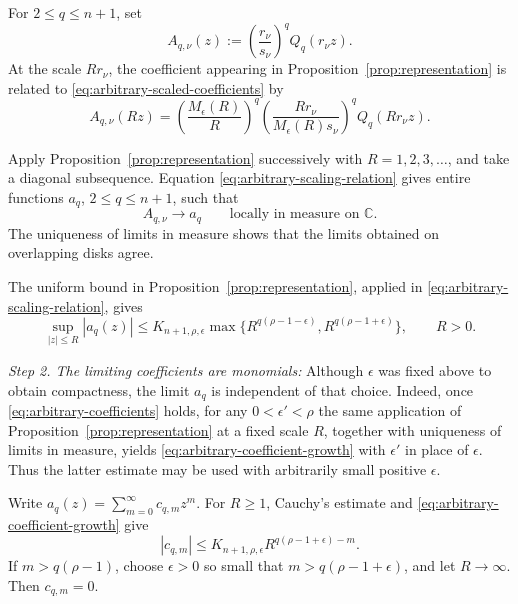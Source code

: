 \documentclass[12pt,letterpaper,reqno]{amsart}
\theoremstyle{definition}
\numberwithin{equation}{section}
\newcommand{\C}{\mathbb C}
\begin{document}
For \(2\leq q\leq n+1\), set
\begin{equation}\label{eq:arbitrary-scaled-coefficients}
 A_{q,\nu}(z)
 :=
 \left(\frac{r_\nu}{s_\nu}\right)^q
 Q_q(r_\nu z).
\end{equation}
At the scale \(Rr_\nu\), the coefficient appearing in
Proposition~\ref{prop:representation} is related to
\eqref{eq:arbitrary-scaled-coefficients} by
\begin{equation}\label{eq:arbitrary-scaling-relation}
 A_{q,\nu}(Rz)
 =
 \left(\frac{M_\epsilon(R)}{R}\right)^q
 \left(
 \frac{Rr_\nu}{M_\epsilon(R)s_\nu}
 \right)^q
 Q_q(Rr_\nu z).
\end{equation}

Apply Proposition~\ref{prop:representation} successively with
\(R=1,2,3,\ldots\), and take a diagonal subsequence. Equation
\eqref{eq:arbitrary-scaling-relation} gives entire functions
\(a_q\), \(2\leq q\leq n+1\), such that
\begin{equation}\label{eq:arbitrary-coefficients}
 A_{q,\nu}\longrightarrow a_q
 \qquad\text{locally in measure on }\C.
\end{equation}
The uniqueness of limits in measure shows that the limits obtained on
overlapping disks agree.

The uniform bound in
Proposition~\ref{prop:representation}, applied in
\eqref{eq:arbitrary-scaling-relation}, gives
\begin{equation}\label{eq:arbitrary-coefficient-growth}
 \sup_{|z|\leq R}|a_q(z)|
 \leq
 K_{{n+1},\rho,\epsilon}
 \max\{
 R^{q(\rho-1-\epsilon)},
 R^{q(\rho-1+\epsilon)}
 \},
 \qquad R>0.
\end{equation}


\medskip\noindent
\emph{{Step 2. The limiting coefficients are monomials:}}
Although \(\epsilon\) was fixed above to obtain compactness, the limit
\(a_q\) is independent of that choice. Indeed, once
\eqref{eq:arbitrary-coefficients} holds, for any
\(0<\epsilon'<\rho\) the same application of
Proposition~\ref{prop:representation} at a fixed scale \(R\), together with
uniqueness of limits in measure, yields
\eqref{eq:arbitrary-coefficient-growth} with \(\epsilon'\) in place of
\(\epsilon\). Thus the latter estimate may be used with arbitrarily small
positive \(\epsilon\).

Write
\(a_q(z)=\sum_{m=0}^{\infty}c_{q,m}z^m\).
For \(R\geq1\), Cauchy's estimate and
\eqref{eq:arbitrary-coefficient-growth} give
\[
|c_{q,m}|
\leq
K_{{n+1},\rho,\epsilon}
R^{q(\rho-1+\epsilon)-m}.
\]
If \(m>q(\rho-1)\), choose \(\epsilon>0\) so small that
\(m>q(\rho-1+\epsilon)\), and let \(R\to\infty\). Then
\(c_{q,m}=0\).
\end{document}
